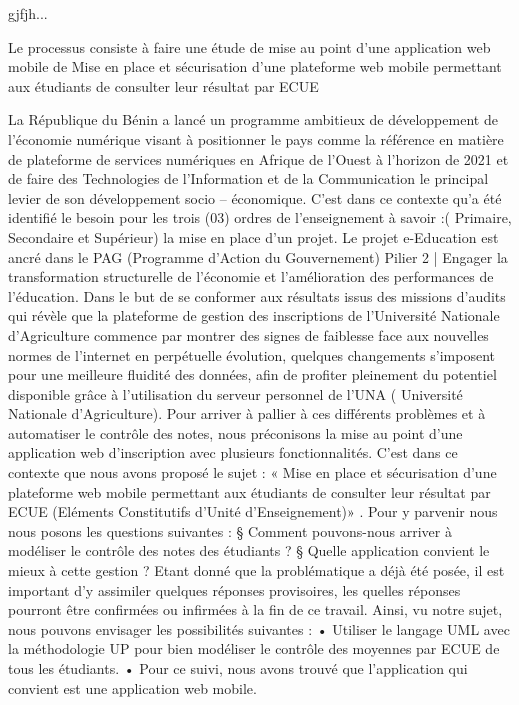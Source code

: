 gjfjh...

Le processus  consiste à faire une étude de mise au point d'une application web mobile de Mise en place et sécurisation d’une plateforme web mobile permettant aux étudiants de consulter leur résultat par ECUE  

La République du Bénin a lancé un programme ambitieux de développement de l’économie numérique visant à positionner le pays comme la référence en matière de plateforme de services numériques en Afrique de l’Ouest à l’horizon de 2021 et de faire des Technologies de l’Information et de la Communication le principal levier de son développement socio – économique.
C’est dans ce contexte qu’a été identifié le besoin pour les trois (03) ordres de l’enseignement à savoir :( Primaire, Secondaire et Supérieur) la mise en place d’un projet. Le projet e-Education est ancré dans le PAG (Programme d’Action du Gouvernement)  Pilier 2 | Engager la transformation structurelle de l’économie  et l’amélioration des performances de l’éducation.
Dans le but de se conformer aux résultats issus des missions d’audits qui révèle que la plateforme de gestion des inscriptions de l’Université Nationale d’Agriculture commence par montrer des signes de faiblesse face aux nouvelles normes de l’internet en perpétuelle évolution, quelques changements s’imposent  pour  une meilleure fluidité des données, afin de profiter pleinement du potentiel disponible grâce à l'utilisation du serveur personnel de l'UNA ( Université Nationale d’Agriculture).
Pour arriver à pallier à ces différents problèmes et à automatiser le contrôle des notes, nous préconisons la mise au point d'une application web d’inscription avec plusieurs fonctionnalités. C’est dans ce contexte que nous avons proposé  le sujet : « Mise en place et sécurisation d’une plateforme web mobile permettant aux étudiants de consulter leur résultat par ECUE (Eléments Constitutifs d’Unité d’Enseignement)» 
. Pour y parvenir nous nous posons les questions suivantes :
§ Comment pouvons-nous arriver à modéliser le contrôle des notes des étudiants ?
§ Quelle application convient le mieux à cette gestion ?	
Etant donné que la problématique a déjà été posée, il est important d'y assimiler quelques réponses provisoires, les quelles réponses pourront être confirmées ou infirmées à la fin de ce travail.
Ainsi, vu notre sujet, nous pouvons envisager les possibilités suivantes :
• Utiliser le langage UML avec la méthodologie UP pour bien modéliser le contrôle des moyennes par ECUE de tous les étudiants.
• Pour ce suivi, nous avons trouvé que l'application qui convient est une application web mobile.




\myCleanStarChapterEnd
